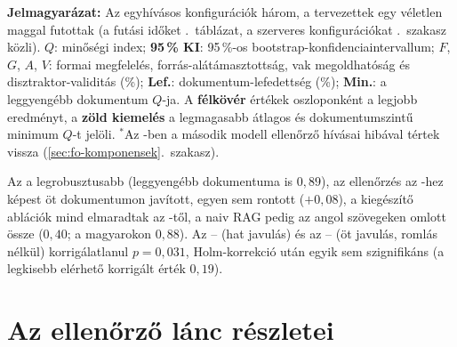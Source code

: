 \begin{table}[htbp]
\vspace{4pt}
\begin{minipage}{\textwidth}
\footnotesize\noindent\textbf{Jelmagyarázat:}
Az egyhívásos konfigurációk három, a tervezettek egy véletlen maggal futottak (a futási időket \az{\ref{tab:koltseg}}.~táblázat, a szerveres konfigurációkat \az{\ref{sec:modellek-szerver}}.~szakasz közli).
$Q$: minőségi index; \textbf{95\,\% KI}: 95\,\%-os bootstrap-konfidenciaintervallum;
$F$, $G$, $A$, $V$: formai megfelelés, forrás-alátámasztottság, vak megoldhatóság és disztraktor-validitás (\%);
\textbf{Lef.}: dokumentum-lefedettség (\%); \textbf{Min.}: a leggyengébb dokumentum $Q$-ja.
A \textbf{félkövér} értékek oszloponként a legjobb eredményt, a \setlength{\fboxsep}{1.5pt}\colorbox[HTML]{E6F4EA}{\textbf{zöld kiemelés}} a legmagasabb átlagos és dokumentumszintű minimum $Q$-t jelöli.
$^\ast$Az -ben a második modell ellenőrző hívásai hibával tértek vissza (\ref{sec:fo-komponensek}.~szakasz).
\end{minipage}
\end{table}

Az  a legrobusztusabb (leggyengébb dokumentuma is $0{,}89$), az ellenőrzés az -hez képest öt
dokumentumon javított, egyen sem rontott ($+0{,}08$), a kiegészítő ablációk mind elmaradtak az -től, a
naiv RAG pedig az angol szövegeken omlott össze ($0{,}40$; a magyarokon $0{,}88$). Az -- (hat
javulás) és az -- (öt javulás, romlás nélkül) korrigálatlanul $p=0{,}031$, Holm-korrekció után
egyik sem szignifikáns (a legkisebb elérhető korrigált érték $0{,}19$).

\section{Az ellenőrző lánc részletei}
\label{app-er-ellenorzo}

